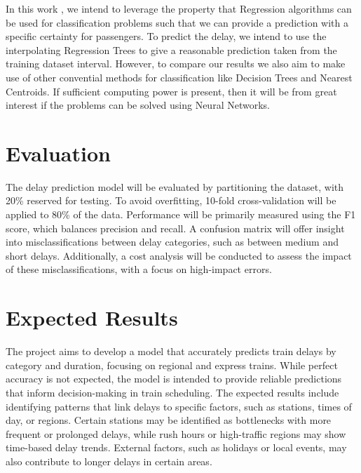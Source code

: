 \documentclass[a4paper,oneside,bibliography=totoc]{scrbook}
\begin{document}
    In this work , we intend to leverage the property that Regression algorithms can be used for classification problems such that we can provide a prediction with a specific certainty for passengers. To predict the delay, we intend to
    use the interpolating Regression Trees to give a reasonable prediction taken from the training dataset interval. However, to compare our results we also aim to make use of other convential methods for classification like Decision Trees and Nearest Centroids.
    If sufficient computing power is present, then it will be from great interest if the problems can be solved using Neural Networks.


    \chapter{Evaluation}\label{ch:eval}
    The delay prediction model will be evaluated by partitioning the dataset, with 20\% reserved for testing.
    To avoid overfitting, 10-fold cross-validation will be applied to 80\% of the data.
    Performance will be primarily measured using the F1 score, which balances precision and recall.
    A confusion matrix will offer insight into misclassifications between delay categories,
    such as between medium and short delays.
    Additionally, a cost analysis will be conducted to assess the impact of these misclassifications,
    with a focus on high-impact errors.

    \chapter{Expected Results}\label{sec:expected_results}

    The project aims to develop a model that accurately predicts train delays by category and duration, focusing on regional and express trains.
    While perfect accuracy is not expected, the model is intended to provide reliable predictions that inform decision-making in train scheduling.
    The expected results include identifying patterns that link delays to specific factors, such as stations, times of day, or regions.
    Certain stations may be identified as bottlenecks with more frequent or prolonged delays, while rush hours or high-traffic regions may show time-based delay trends.
    External factors, such as holidays or local events, may also contribute to longer delays in certain areas.



    
\end{document}
